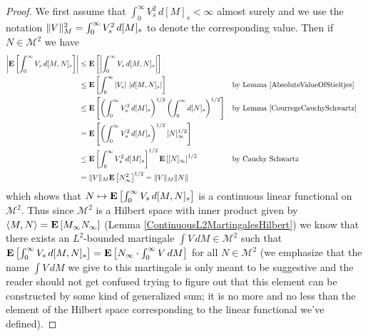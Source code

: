 \begin{proof}
We first assume that $\int_0^\infty V^2_s \, d[M]_s < \infty$ almost surely and we use the notation $\lVert V \rVert^2_M = \int_0^\infty V^2_s \, d[M]_s$ to denote the corresponding value.  Then if $N \in \mathcal{M}^2$ we have
\begin{align*}
\left \vert \textbf{E}\left[\int_0^\infty V_s \, d[M,N]_s\right] \right \vert &\leq \textbf{E}\left[\left \vert \int_0^\infty V_s \, d[M,N]_s \right \vert\right] \\
&\leq  \textbf{E}\left[\int_0^\infty \left \vert V_s \right \vert \, \left \vert  d[M,N]_s \right \vert\right] && \text{by Lemma \ref{AbsoluteValueOfStieltjes}} \\
&\leq  \textbf{E}\left[\left(\int_0^\infty V^2_s \, d[M]_s\right)^{1/2}\left(\int_0^\infty d[N]_s\right)^{1/2}\right] && \text{by Lemma \ref{CourregeCauchySchwartz}} \\
&=  \textbf{E}\left[\left(\int_0^\infty V^2_s \, d[M]_s\right)^{1/2}[N]_\infty^{1/2}\right] \\
&\leq \textbf{E}\left[\int_0^\infty V^2_s \, d[M]_s\right]^{1/2}\textbf{E}\left[[N]_\infty\right]^{1/2} && \text{by Cauchy Schwartz} \\
&=\lVert V \rVert_M \textbf{E}\left[N^2_\infty\right]^{1/2} = \lVert V \rVert_M \lVert N \rVert
\end{align*}
which shows that $N \mapsto \textbf{E}\left[\int_0^\infty V_s \, d[M,N]_s\right]$ is a continuous linear functional on $\mathcal{M}^2$.  Thus since $\mathcal{M}^2$ is a Hilbert space with inner product given by $\langle M,N \rangle = \textbf{E}\left[M_\infty N_\infty\right]$ (Lemma \ref{ContinuousL2MartingalesHilbert}) we know that there exists an $L^2$-bounded martingale $\int V \, dM \in \mathcal{M}^2$ such that $\textbf{E}\left[\int_0^\infty V_s \, d[M,N]_s \right] = \textbf{E}\left[N_\infty \cdot \int_0^\infty V \, dM\right]$ for all $N \in \mathcal{M}^2$ (we emphasize that the name $\int V \, dM$ we give to this martingale is only meant to be suggestive and the reader should not get confused trying to figure out that this element can be constructed by some kind of generalized sum; it is no more and no less than the element of the Hilbert space corresponding to the linear functional we've defined).


\end{proof}
